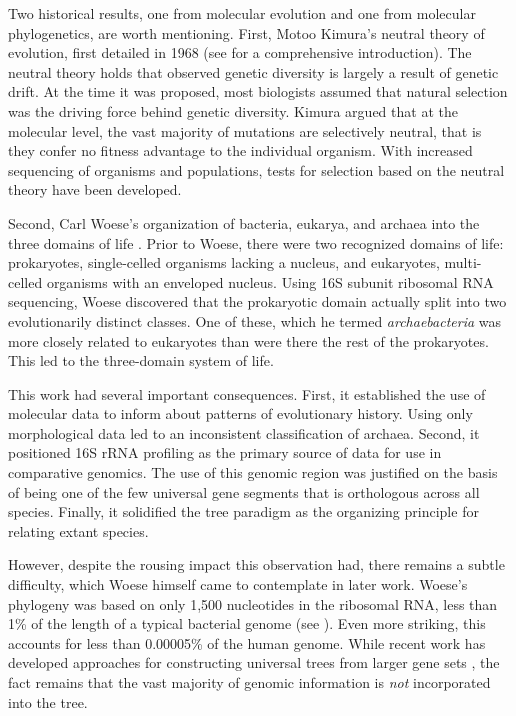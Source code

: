 Two historical results, one from molecular evolution and one from molecular phylogenetics, are worth mentioning.
First, Motoo Kimura's neutral theory of evolution, first detailed in 1968 \cite{Kimura:1968vw} (see \cite{Kimura:1984} for a comprehensive introduction).
The neutral theory holds that observed genetic diversity is largely a result of genetic drift.
At the time it was proposed, most biologists assumed that natural selection was the driving force behind genetic diversity.
Kimura argued that at the molecular level, the vast majority of mutations are selectively neutral, that is they confer no fitness advantage to the individual organism.
With increased sequencing of organisms and populations, tests for selection based on the neutral theory have been developed.

Second, Carl Woese's organization of bacteria, eukarya, and archaea into the three domains of life \cite{Woese:1977vd}.
Prior to Woese, there were two recognized domains of life: prokaryotes, single-celled organisms lacking a nucleus, and eukaryotes, multi-celled organisms with an enveloped nucleus.
Using 16S subunit ribosomal RNA sequencing, Woese discovered that the prokaryotic domain actually split into two evolutionarily distinct classes.
One of these, which he termed \emph{archaebacteria} was more closely related to eukaryotes than were there the rest of the prokaryotes.
This led to the three-domain system of life.

This work had several important consequences.
First, it established the use of molecular data to inform about patterns of evolutionary history.
Using only morphological data led to an inconsistent classification of archaea.
Second, it positioned 16S rRNA profiling as the primary source of data for use in comparative genomics.
The use of this genomic region was justified on the basis of being one of the few universal gene segments  that is orthologous across all species.
Finally, it solidified the tree paradigm as the organizing principle for relating extant species.

However, despite the rousing impact this observation had, there remains a subtle difficulty, which Woese himself came to contemplate in later work.
Woese's phylogeny was based on only 1,500 nucleotides in the ribosomal RNA, less than 1\% of the length of a typical bacterial genome (see \cite{Dagan:2006up}).
Even more striking, this accounts for less than 0.00005\% of the human genome.
While recent work has developed approaches for constructing universal trees from larger gene sets \cite{Ciccarelli:2006gw}, the fact remains that the vast majority of genomic information is \emph{not} incorporated into the tree.

